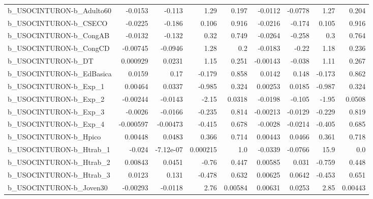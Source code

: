 \begin{tabular}{lrrrrrrrr}
b\_USOCINTURON-b\_Adulto60   &     -0.0153 &       -0.113 &      1.29 &    0.197 &    -0.0112 &     -0.0778 &         1.27 &         0.204 \\
b\_USOCINTURON-b\_CSECO      &     -0.0225 &       -0.186 &     0.106 &    0.916 &    -0.0216 &      -0.174 &        0.105 &         0.916 \\
b\_USOCINTURON-b\_CongAB     &     -0.0132 &       -0.132 &      0.32 &    0.749 &    -0.0264 &      -0.258 &          0.3 &         0.764 \\
b\_USOCINTURON-b\_CongCD     &    -0.00745 &      -0.0946 &      1.28 &      0.2 &    -0.0183 &       -0.22 &         1.18 &         0.236 \\
b\_USOCINTURON-b\_DT         &    0.000929 &       0.0231 &      1.15 &    0.251 &   -0.00143 &      -0.038 &         1.11 &         0.267 \\
b\_USOCINTURON-b\_EdBasica   &      0.0159 &         0.17 &    -0.179 &    0.858 &     0.0142 &       0.148 &       -0.173 &         0.862 \\
b\_USOCINTURON-b\_Exp\_1      &     0.00464 &       0.0337 &    -0.985 &    0.324 &    0.00253 &      0.0185 &       -0.987 &         0.324 \\
b\_USOCINTURON-b\_Exp\_2      &    -0.00244 &      -0.0143 &     -2.15 &   0.0318 &    -0.0198 &      -0.105 &        -1.95 &        0.0508 \\
b\_USOCINTURON-b\_Exp\_3      &     -0.0026 &      -0.0166 &    -0.235 &    0.814 &   -0.00213 &     -0.0129 &       -0.229 &         0.819 \\
b\_USOCINTURON-b\_Exp\_4      &   -0.000597 &     -0.00473 &    -0.415 &    0.678 &    -0.0028 &     -0.0214 &       -0.405 &         0.685 \\
b\_USOCINTURON-b\_Hpico      &     0.00448 &       0.0483 &     0.366 &    0.714 &    0.00443 &      0.0466 &        0.361 &         0.718 \\
b\_USOCINTURON-b\_Htrab\_1    &      -0.024 &    -7.12e-07 &  0.000215 &      1.0 &    -0.0339 &     -0.0766 &         15.9 &           0.0 \\
b\_USOCINTURON-b\_Htrab\_2    &     0.00843 &       0.0451 &     -0.76 &    0.447 &    0.00585 &       0.031 &       -0.759 &         0.448 \\
b\_USOCINTURON-b\_Htrab\_3    &      0.0123 &        0.131 &    -0.478 &    0.632 &    0.00625 &      0.0642 &       -0.453 &         0.651 \\
b\_USOCINTURON-b\_Joven30    &    -0.00293 &      -0.0118 &      2.76 &  0.00584 &    0.00631 &      0.0253 &         2.85 &       0.00443 \\

\end{tabular}
